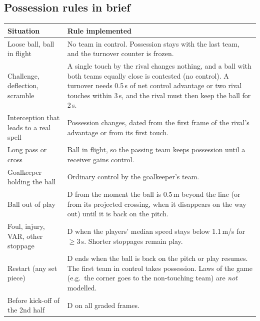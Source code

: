\documentclass[11pt,a4paper]{article}
\begin{document}
\subsection{Possession rules in brief}
\label{sec:rules}
\begin{center}
\small
{\renewcommand{\arraystretch}{1.3}
\begin{tabularx}{\textwidth}{|p{}|X|}
\hline
\textbf{Situation} & \textbf{Rule implemented} \\
\hline
Loose ball, ball in flight & No team in control. Possession stays with the last team, and the turnover counter is
  frozen. \\
\hline
Challenge, deflection, scramble & A single touch by the rival changes nothing, and a ball with both teams equally
  close is contested (no control). A turnover needs 0.5\,s of net control advantage or two rival touches within 3\,s,
  and the rival must then keep the ball for 2\,s. \\
\hline
Interception that leads to a real spell & Possession changes, dated from the first frame of the rival's advantage or
  from its first touch. \\
\hline
Long pass or cross & Ball in flight, so the passing team keeps possession until a receiver gains control. \\
\hline
Goalkeeper holding the ball & Ordinary control by the goalkeeper's team. \\
\hline
Ball out of play & D from the moment the ball is 0.5\,m beyond the line (or from its projected crossing, when it
  disappears on the way out) until it is back on the pitch. \\
\hline
Foul, injury, VAR, other stoppage & D when the players' median speed stays below 1.1\,m/s for $\ge$3\,s. Shorter
  stoppages remain play. \\
\hline
Restart (any set piece) & D ends when the ball is back on the pitch or play resumes. The first team in control takes
  possession. Laws of the game (e.g.\ the corner goes to the non-touching team) are \emph{not} modelled. \\
\hline
Before kick-off of the 2nd half & D on all graded frames. \\
\hline
\end{tabularx}}
\end{center}
\end{document}
